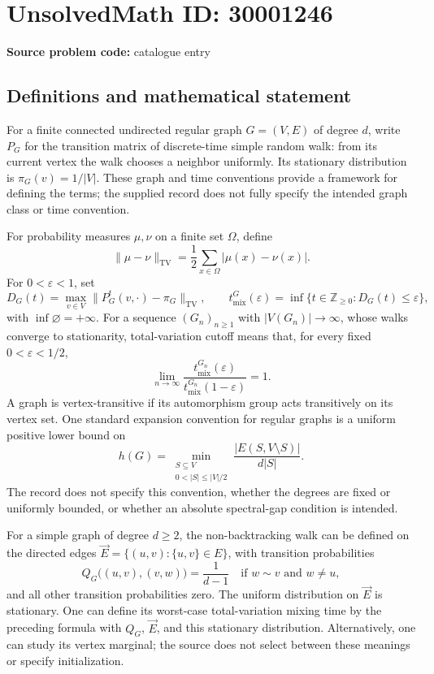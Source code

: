 \documentclass[11pt]{article}
\newcommand{\Z}{\mathbb{Z}}
\begin{document}
\section*{UnsolvedMath ID: 30001246}
\textbf{Source problem code:} catalogue entry
\subsection{Definitions and mathematical statement}
For a finite connected undirected regular graph \(G=(V,E)\) of degree \(d\), write \(P_G\) for the transition matrix of discrete-time simple random walk: from its current vertex the walk chooses a neighbor uniformly. Its stationary distribution is \(\pi_G(v)=1/|V|\). These graph and time conventions provide a framework for defining the terms; the supplied record does not fully specify the intended graph class or time convention.

For probability measures \(\mu,\nu\) on a finite set \(\Omega\), define
\[
 \|\mu-\nu\|_{\mathrm{TV}}=\frac12\sum_{x\in\Omega}|\mu(x)-\nu(x)|.
\]
For \(0<\varepsilon<1\), set
\[
 D_G(t)=\max_{v\in V}\|P_G^t(v,\cdot)-\pi_G\|_{\mathrm{TV}},\qquad
 t_{\mathrm{mix}}^G(\varepsilon)=\inf\{t\in\Z_{\geq0}:D_G(t)\leq\varepsilon\},
\]
with \(\inf\varnothing=+\infty\). For a sequence \((G_n)_{n\geq1}\) with \(|V(G_n)|\to\infty\), whose walks converge to stationarity, total-variation cutoff means that, for every fixed \(0<\varepsilon<1/2\),
\[
 \lim_{n\to\infty}
 \frac{t_{\mathrm{mix}}^{G_n}(\varepsilon)}
 {t_{\mathrm{mix}}^{G_n}(1-\varepsilon)}=1.
\]
A graph is vertex-transitive if its automorphism group acts transitively on its vertex set. One standard expansion convention for regular graphs is a uniform positive lower bound on
\[
 h(G)=\min_{\substack{S\subseteq V\\0<|S|\leq |V|/2}}
 \frac{|E(S,V\setminus S)|}{d|S|}.
\]
The record does not specify this convention, whether the degrees are fixed or uniformly bounded, or whether an absolute spectral-gap condition is intended.

For a simple graph of degree \(d\geq2\), the non-backtracking walk can be defined on the directed edges
\(\vec E=\{(u,v):\{u,v\}\in E\}\), with transition probabilities
\[
 Q_G\bigl((u,v),(v,w)\bigr)=\frac1{d-1}
 \quad\text{if }w\sim v\text{ and }w\ne u,
\]
and all other transition probabilities zero. The uniform distribution on \(\vec E\) is stationary. One can define its worst-case total-variation mixing time by the preceding formula with \(Q_G\), \(\vec E\), and this stationary distribution. Alternatively, one can study its vertex marginal; the source does not select between these meanings or specify initialization.
\end{document}
